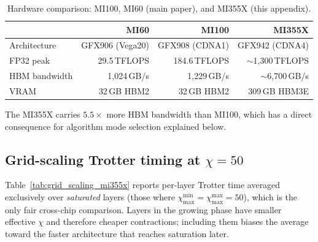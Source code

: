\documentclass[11pt]{article}
\newcommand{\chimax}{\chi_{\mathrm{max}}}
\begin{document}
\begin{table}[ht]
\centering
\caption{Hardware comparison: MI100, MI60 (main paper), and MI355X (this appendix).}
\label{tab:hardware_mi355x}
\small
\begin{tabular}{lrrr}
\toprule
                  & MI60              & MI100             & MI355X \\
\midrule
Architecture      & GFX906 (Vega20)   & GFX908 (CDNA1)    & GFX942 (CDNA4) \\
FP32 peak         & 29.5\,TFLOPS      & 184.6\,TFLOPS     & $\sim$1,300\,TFLOPS \\
HBM bandwidth     & 1{,}024\,GB/s     & 1{,}229\,GB/s     & $\sim$6{,}700\,GB/s \\
VRAM              & 32\,GB HBM2       & 32\,GB HBM2       & 309\,GB HBM3E \\
\bottomrule
\end{tabular}
\end{table}

The MI355X carries $\mathbf{5.5\times}$ more HBM bandwidth than MI100, which
has a direct consequence for algorithm mode selection explained below.

\subsection*{Grid-scaling Trotter timing at $\chi = 50$}

Table~\ref{tab:grid_scaling_mi355x} reports per-layer Trotter time averaged
exclusively over \emph{saturated} layers (those where $\chimax^{\min} =
\chimax^{\max} = 50$), which is the only fair cross-chip comparison.
Layers in the growing phase have smaller effective $\chi$ and therefore cheaper
contractions; including them biases the average toward the faster architecture
that reaches saturation later.
\end{document}
